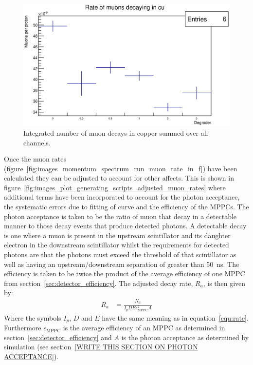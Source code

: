 \begin{figure}[hptb]
  \centering
    \includegraphics[width=.9\textwidth]{images/momentum_spectrum/run_muon_rate_in_cu.eps}
  \caption{Integrated number of muon decays in copper summed over all channels.}
  \label{fig:images_momentum_spectrum_run_muon_rate_in_cu}
\end{figure}
\clearpage
Once the muon rates (figure~\ref{fig:images_momentum_spectrum_run_muon_rate_in_f}) have been calculated they can be adjusted to account for other affects. This is shown in figure~\ref{fig:images_plot_generating_scripts_adjusted_muon_rates} where additional terms have been incorporated to account for the photon acceptance, the systematic errors due to fitting of curve and the efficiency of the MPPCs. The photon acceptance is taken to be the ratio of muon that decay in a detectable manner to those decay events that produce detected photons. A detectable decay is one where a muon is present in the upstream scintillator and its daughter electron in the downstream scintillator whilst the requirements for detected photons are that the photons must exceed the threshold of that scintillator as well as having an upstream/downstream separation of greater than 50~ns. The efficiency is taken to be twice the product of the average efficiency of one MPPC from section~\ref{sec:detector_efficiency}. The adjusted decay rate, \(R_a\), is then given by:
\begin{align}
    R_a &= \frac{N_{\mu}}{I_p D E \epsilon_{\text{MPPC}}^2 A } \label{equ:adj_rate}
\end{align}
Where the symbols \(I_p\), \(D\) and \(E\) have the same meaning as in equation~\eqref{equ:rate}. Furthermore \(\epsilon_{\text{MPPC}}\) is the average efficiency of an MPPC as determined in section~\ref{sec:detector_efficiency} and \(A\) is the photon acceptance as determined by simulation (see section~\ref{WRITE THIS SECTION ON PHOTON ACCEPTANCE}). 

